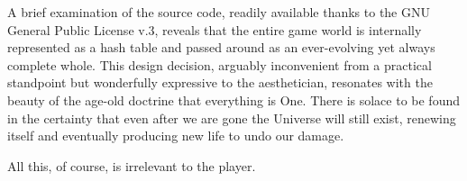 \documentclass[12pt]{article}
\begin{document}
A brief examination of the source code, readily available thanks to the GNU General Public License v.3, reveals that the entire game world is internally represented as a hash table and passed around as an ever-evolving yet always complete whole. This design decision, arguably inconvenient from a practical standpoint but wonderfully expressive to the aesthetician, resonates with the beauty of the age-old doctrine that everything is One. There is solace to be found in the certainty that even after we are gone the Universe will still exist, renewing itself and eventually producing new life to undo our damage.

All this, of course, is irrelevant to the player.
\end{document}
